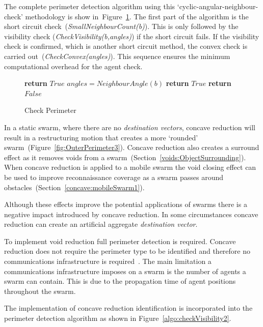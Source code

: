 \documentclass{ieeeaccess}
\begin{document}
The complete perimeter detection algorithm using this `cyclic-angular-neighbour-check' methodology is show in~Figure~\ref{algo:CheckPerimeter}. The first part of the algorithm is the short circuit check~(\textit{SmallNeighbourCount(b)}). This is only followed by the visibility check (\textit{CheckVisibility(b,angles)}) if the short circuit fails. If the visibility check is confirmed, which is another short circuit method, the convex check is carried out~(\textit{CheckConvex(angles)}). This sequence ensures the minimum computational overhead for the agent check. 

\begin{figure}
\begin{algorithmic}
\tiny
{}
	\State\textbf{return} $True$
\EndIf
\State$angles = NeighbourAngle(b)$
		\State\textbf{return} $True$
	\EndIf
\EndIf
\State\textbf{return} $False$
\EndProcedure
\end{algorithmic}
\caption{Check Perimeter}
\label{algo:CheckPerimeter}
\end{figure}

In a static swarm, where there are no \textit{destination vectors}, concave reduction will result in a restructuring motion that creates a more `rounded' swarm~(Figure~\ref{fig:OuterPerimeter3}). Concave reduction also creates a surround effect as it removes voids from a swarm~(Section~\ref{voids:ObjectSurrounding}). When concave reduction is applied to a mobile swarm the void closing effect can be used to improve reconnaissance coverage as a swarm passes around obstacles~(Section~\ref{concave:mobileSwarm1}).

Although these effects improve the potential applications of swarms there is a negative impact introduced by concave reduction. In some circumstances concave reduction can create an artificial aggregate \textit{destination vector}. 

To implement void reduction full perimeter detection is required. Concave reduction does not require the perimeter type to be identified and therefore no communications infrastructure is required~\cite{MD:09,NIM:09,SOM:12,ZFG:13,JG:13}. The main limitation a communications infrastructure imposes on a swarm is the number of agents a swarm can contain. This is due to the propagation time of agent positions throughout the swarm. 

The implementation of concave reduction identification is incorporated into the perimeter detection algorithm as shown in Figure~\ref{algo:checkVisibility2}.\\
\end{document}
